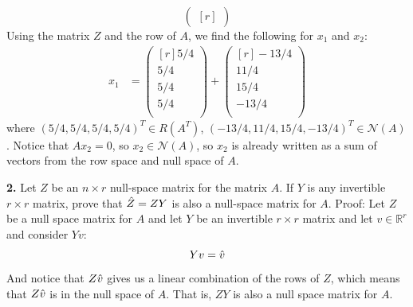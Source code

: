 \documentclass{article}
\begin{document}
\begin{itemize}
\[\begin{pmatrix*}[r]
        \end{pmatrix*}\]
        Using the matrix $Z$ and the row of $A$, we find the following for $x_1$ and $x_2$:
        \begin{align*}
            x_1 &= \begin{pmatrix*}[r]
                5/4\\
                5/4\\
                5/4\\
                5/4\\
            \end{pmatrix*} + \begin{pmatrix*}[r]
                -13/4\\
                11/4\\
                15/4\\
                -13/4\\
            \end{pmatrix*}
        \end{align*}
        where $(5/4, 5/4, 5/4, 5/4)^T \in R(A^T)$, $(-13/4,11/4,15/4,-13/4)^T \in \mathcal{N}(A)$. Notice that $Ax_2 = 0$, so $x_2 \in \mathcal{N}(A)$, so $x_2$ is already written as a sum of vectors from the row space and null space of $A$.
    \end{itemize}

    \textbf{2.} Let $Z$ be an $n \times r$ null-space matrix for the matrix $A$. If $Y$ is any invertible $r \times r$ matrix, prove that $\Hat{Z} = ZY$ is also a null-space matrix for $A$.
    \newline\newline
    Proof: Let $Z$ be a null space matrix for $A$ and let $Y$ be an invertible $r \times r$ matrix and let $v \in \mathbb{R}^r$ and consider $Yv$:
    \[Yv = \Hat{v}\]
    And notice that $Z\Hat{v}$ gives us a linear combination of the rows of $Z$, which means that $Z\Hat{v}$ is in the null space of $A$. That is, $ZY$ is also a null space matrix for $A$.
\newline\newline
\end{document}
